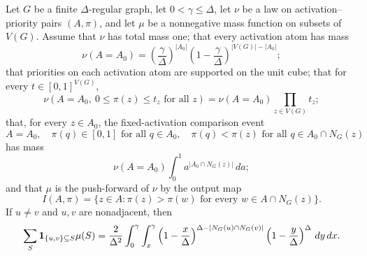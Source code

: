 \begin{lemma}
Let \(G\) be a finite \(\Delta\)-regular graph, let \(0<\gamma\le \Delta\),
let \(\nu\) be a law on activation--priority pairs \((A,\pi)\), and let
\(\mu\) be a nonnegative mass function on subsets of \(V(G)\).  Assume that
\(\nu\) has total mass one; that every
activation atom has mass
\[
\nu(A=A_0)=
\left(\frac{\gamma}{\Delta}\right)^{|A_0|}
\left(1-\frac{\gamma}{\Delta}\right)^{|V(G)|-|A_0|};
\]
that priorities on each activation atom are supported on the unit cube; that
for every \(t\in[0,1]^{V(G)}\),
\[
\nu(A=A_0,\ 0\le \pi(z)\le t_z\text{ for all }z)
=\nu(A=A_0)\prod_{z\in V(G)}t_z;
\]
that, for every \(z\in A_0\), the fixed-activation comparison event
\[
A=A_0,\quad \pi(q)\in[0,1]\text{ for all }q\in A_0,\quad
\pi(q)<\pi(z)\text{ for all }q\in A_0\cap N_G(z)
\]
has mass
\[
\nu(A=A_0)\int_0^1 a^{|A_0\cap N_G(z)|}\,da;
\]
and that \(\mu\) is the push-forward of \(\nu\) by the output map
\[
I(A,\pi)=\{z\in A:\pi(z)>\pi(w)\text{ for every }w\in A\cap N_G(z)\}.
\]
If \(u\ne v\) and \(u,v\) are nonadjacent, then
\[
\sum_S {\bf 1}_{\{u,v\}\subseteq S}\mu(S)
=
\frac{2}{\Delta^2}\int_0^\gamma\int_x^\gamma
\left(1-\frac{x}{\Delta}\right)^{
\Delta-|N_G(u)\cap N_G(v)|}
\left(1-\frac{y}{\Delta}\right)^\Delta\,dy\,dx .
\]
\end{lemma}
